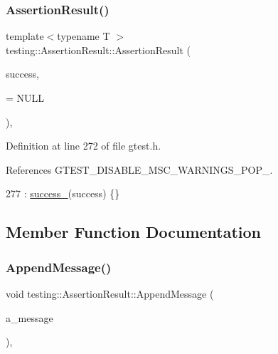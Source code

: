 \subsubsection{\texorpdfstring{Assertion\+Result()}{AssertionResult()}\hspace{0.1cm}{\footnotesize\ttfamily [2/2]}}
{\footnotesize\ttfamily template$<$typename T $>$ \\
testing\+::\+Assertion\+Result\+::\+Assertion\+Result (\begin{DoxyParamCaption}\item[{const T \&}]{success,  }\item[{typename \hyperlink{structtesting_1_1internal_1_1EnableIf}{internal\+::\+Enable\+If}$<$ !\hyperlink{classtesting_1_1internal_1_1ImplicitlyConvertible}{internal\+::\+Implicitly\+Convertible}$<$ T, \hyperlink{classtesting_1_1AssertionResult}{Assertion\+Result} $>$\+::value $>$\+::type $\ast$}]{ = {\ttfamily NULL} }\end{DoxyParamCaption})\hspace{0.3cm}{\ttfamily [inline]}, {\ttfamily [explicit]}}



Definition at line 272 of file gtest.\+h.



References G\+T\+E\+S\+T\+\_\+\+D\+I\+S\+A\+B\+L\+E\+\_\+\+M\+S\+C\+\_\+\+W\+A\+R\+N\+I\+N\+G\+S\+\_\+\+P\+O\+P\+\_\+.


\begin{DoxyCode}
277       : \hyperlink{classtesting_1_1AssertionResult_ae7348f9fffe7a20980dfc94fc261d7ca}{success\_}(success) \{\}
\end{DoxyCode}


\subsection{Member Function Documentation}
\mbox{\label{classtesting_1_1AssertionResult_a5b55e01f1321d744a594dbe51d46a139}} 
\subsubsection{\texorpdfstring{Append\+Message()}{AppendMessage()}}
{\footnotesize\ttfamily void testing\+::\+Assertion\+Result\+::\+Append\+Message (\begin{DoxyParamCaption}\item[{const \hyperlink{classtesting_1_1Message}{Message} \&}]{a\+\_\+message }\end{DoxyParamCaption})\hspace{0.3cm}{\ttfamily [inline]}, {\ttfamily [private]}}



